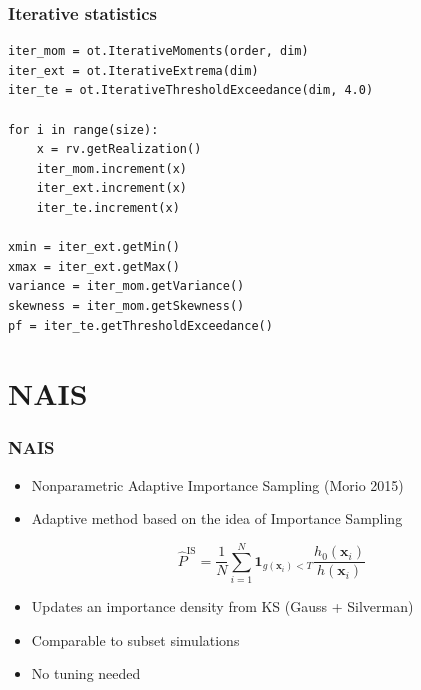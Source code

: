 \documentclass[aspectratio=169]{beamer}
\begin{document}
\begin{frame}[containsverbatim]
\frametitle{Iterative statistics}

\lstset{language=python}
\begin{lstlisting}
iter_mom = ot.IterativeMoments(order, dim)
iter_ext = ot.IterativeExtrema(dim)
iter_te = ot.IterativeThresholdExceedance(dim, 4.0)

for i in range(size):
    x = rv.getRealization()
    iter_mom.increment(x)
    iter_ext.increment(x)
    iter_te.increment(x)

xmin = iter_ext.getMin()
xmax = iter_ext.getMax()
variance = iter_mom.getVariance()
skewness = iter_mom.getSkewness()
pf = iter_te.getThresholdExceedance()
\end{lstlisting}


\end{frame}


\section{NAIS}


\begin{frame}[containsverbatim]
\frametitle{NAIS}

\begin{itemize}
\item Nonparametric Adaptive Importance Sampling (Morio 2015)

\item Adaptive method based on the idea of Importance Sampling

$$
\widehat{P}^\text{IS}=\frac{1}{N} \sum_{i=1}^{N} {\mathbf{1}}_{g(\mathbf{x}_i)<T} \frac{h_0(\mathbf{x}_i)}{h(\mathbf{x}_i)}
$$

\item Updates an importance density from KS (Gauss + Silverman)

\item Comparable to subset simulations

\item No tuning needed
\end{itemize}


\end{frame}



\end{document}
